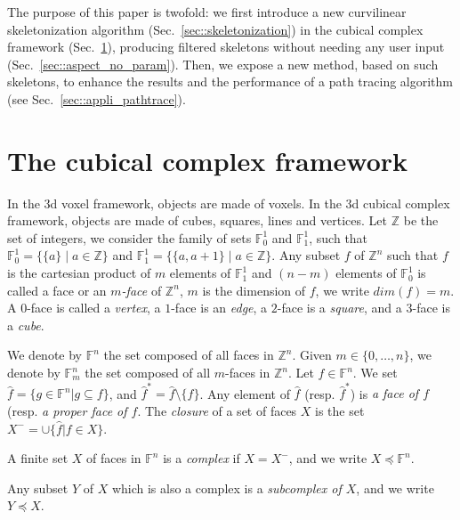 \documentclass[final,envcountsame]{llncs}
\def\myem#1{{\em #1}}
\def\Z{\mathbb{Z}}
\def\allfaces#1{\mathbb{F}^{#1}}
\def\subfaces#1#2{\allfaces{#1}_{#2}}
\def\subcomplex#1#2{#1 \preceq #2}
\def\complex#1#2{\subcomplex{#2}{\allfaces{#1}}}
\def\cell#1{\hat{#1}}
\def\cellstrict#1{\hat{#1}^*}
\def\closure#1{#1^-}
\def\suchthat{\;|\;}
\def\union{\cup}
\def\dinterval#1#2{\{#1,\ldots,#2\}}
\begin{document}
The purpose of this paper is twofold: we first introduce a new curvilinear skeletonization algorithm (Sec.~\ref{sec::skeletonization}) in the cubical complex framework (Sec.~\ref{sec::binary_to_cubic}), producing filtered skeletons without needing any user input (Sec.~\ref{sec::aspect_no_param}). 
Then, we expose a new method, based on such skeletons, to enhance the results and the performance of a path tracing algorithm (see Sec.~\ref{sec::appli_pathtrace}).

\section{The cubical complex framework}
\label{sec::binary_to_cubic}

In the 3d voxel framework, objects are made of voxels. In the 3d cubical complex framework, objects are made of cubes, squares, lines and vertices. 
Let $\Z$ be the set of integers, we consider the family of sets $\mathbb{F}^1_0$ and $\mathbb{F}^1_1$, such that $\mathbb{F}^1_0 = \{\{a\} \suchthat a \in \Z\}$ and $\mathbb{F}^1_1 = \{ \{a, a+1\} \suchthat a \in \Z\}$. Any subset $f$ of $\Z^n$ such that $f$ is the cartesian product of $m$ elements of $\mathbb{F}^1_1$ and $(n-m)$ elements of $\mathbb{F}^1_0$ is called a face or an \myem{$m$-face} of $\Z^n$, $m$ is the dimension of $f$, we write $dim(f)=m$. A $0$-face is called a \myem{vertex}, a $1$-face is an \myem{edge}, a $2$-face is a \myem{square}, and a $3$-face is a \myem{cube}.

We denote by $\allfaces{n}$ the set composed of all faces in $\Z^n$. Given $m \in \dinterval{0}{n}$, we denote by $\subfaces{n}{m}$ the set composed of all $m$-faces in $\Z^n$.
Let $f \in \allfaces{n}$. We set $\cell{f} = \{g \in \allfaces{n}\vert g \subseteq f\}$, and $\cellstrict{f} = \cell{f} \setminus \{f\}$. Any element of $\cell{f}$ (resp. $\cellstrict{f}$) is \myem{a face of $f$} (resp. \myem{a proper face of $f$}.
The \myem{closure} of a set of faces $X$ is the set $\closure{X}=\union\{\cell{f} \vert f \in X\}$.

\begin{definition}
A finite set $X$ of faces in $\allfaces{n}$ is a \myem{complex} if $X=\closure{X}$, and we write $\complex{n}{X}$. 

Any subset $Y$ of $X$ which is also a complex is a \myem{subcomplex of $X$}, and we write $\subcomplex{Y}{X}$.
\end{definition}


\end{document}
